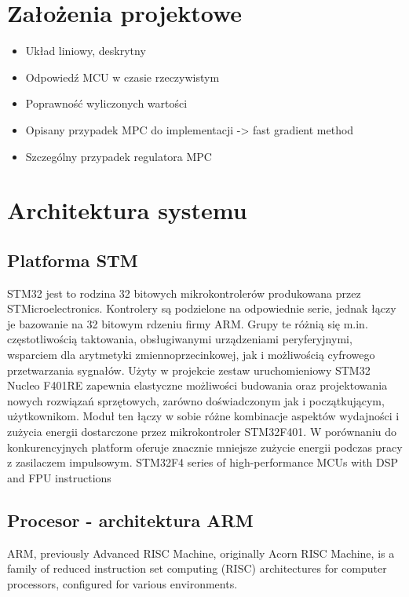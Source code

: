 \section{Założenia projektowe} \label{sec:assumptions}
\begin{itemize}
	\item Układ liniowy, deskrytny
	\item Odpowiedź MCU w czasie rzeczywistym
    \item Poprawność wyliczonych wartości
    \item Opisany przypadek MPC do implementacji -> fast gradient method
    \item Szczególny przypadek regulatora MPC
\end{itemize}

\section{Architektura systemu} \label{sec:system}

\subsection{Platforma STM} \label{sec:stm}
STM32 jest to rodzina 32 bitowych mikrokontrolerów produkowana przez STMicroelectronics.
Kontrolery są podzielone na odpowiednie serie, jednak łączy je bazowanie na 32 bitowym
rdzeniu firmy ARM. Grupy te różnią się m.in. częstotliwością taktowania, obsługiwanymi
urządzeniami peryferyjnymi, wsparciem dla arytmetyki zmiennoprzecinkowej, jak i możliwością
cyfrowego przetwarzania sygnałów.
Użyty w projekcie zestaw uruchomieniowy STM32 Nucleo F401RE zapewnia elastyczne
możliwości budowania oraz projektowania nowych rozwiązań sprzętowych, zarówno
doświadczonym jak i początkującym, użytkownikom. Moduł ten łączy w sobie różne kombinacje
aspektów wydajności i zużycia energii dostarczone przez mikrokontroler STM32F401.
W porównaniu do konkurencyjnych platform oferuje znacznie mniejsze zużycie energii
podczas pracy z zasilaczem impulsowym.
STM32F4 series of high-performance MCUs with DSP and FPU instructions

\subsection{Procesor - architektura ARM} \label{sec:arm}
ARM, previously Advanced RISC Machine, originally Acorn RISC Machine, is a family of reduced
instruction set computing (RISC) architectures for computer processors, configured for various
environments.

